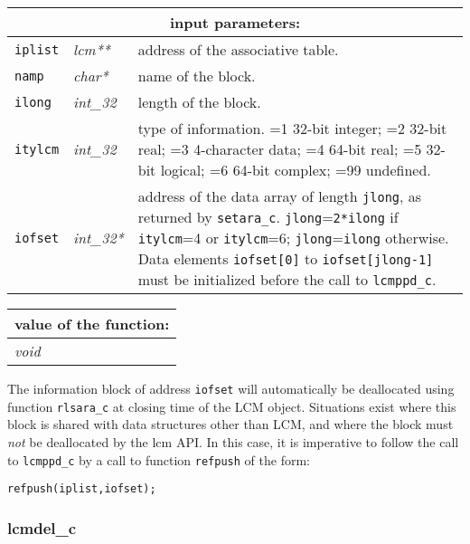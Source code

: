 \noindent
\begin{tabular}{|p{1.5cm}|p{2cm}|p{11cm}|}
\hline
\multicolumn{3}{|c|}{\bf input parameters:} \\
\hline
{\tt iplist} & {\it lcm**} & address of the associative table. \\
\hline
{\tt namp} & {\it char*} & name of the block. \\
\hline
{\tt ilong} & {\it int\_32} & length of the block. \\
\hline
{\tt itylcm} & {\it int\_32} & type of information. =1 32-bit integer; 
                                    =2 32-bit real; =3 4-character data; 
				    =4 64-bit real; =5 32-bit logical; =6 64-bit complex; =99 undefined. \\
\hline
{\tt iofset} & {\it int\_32*} & address of the data array of length {\tt jlong}, as returned by {\tt setara\_c}. {\tt jlong}={\tt 2*ilong}
                                   if {\tt itylcm}=4 or {\tt itylcm}=6; {\tt jlong}={\tt ilong} otherwise.
                                   Data elements {\tt iofset[0]} to {\tt iofset[jlong-1]} 
				   must be initialized before the call to {\tt lcmppd\_c}. \\
\hline
\end{tabular}

\vskip 0.8cm

\noindent
\begin{tabular}{|p{4.0cm}|p{11cm}|}
\hline
\multicolumn{2}{|c|}{\bf value of the function:} \\
\hline
{\it void} &  \\
\hline
\end{tabular}

\vskip 0.4cm

The information block of address {\tt iofset} will automatically be deallocated using function {\tt rlsara\_c} 
at closing time of the LCM object. Situations exist where this block is shared with data structures other
than LCM, and where the block must {\sl not} be deallocated by the {\sc lcm} API. In this case, it is imperative
to follow the call to {\tt lcmppd\_c} by a call to function {\tt refpush} of the form:
 
\begin{verbatim}
refpush(iplist,iofset);
\end{verbatim}

\subsubsection{lcmdel\_c}

